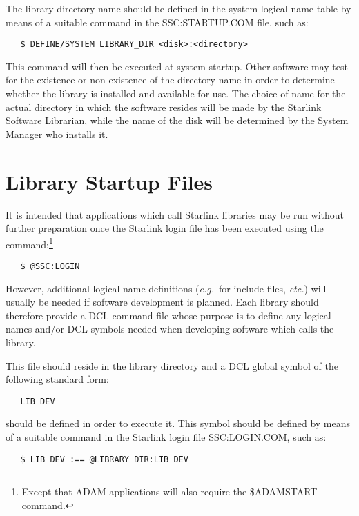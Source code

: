 The library directory name should be defined in the system logical name
table by means of a suitable command in the SSC:STARTUP.COM file, such as: 

\begin{verbatim}
   $ DEFINE/SYSTEM LIBRARY_DIR <disk>:<directory>
\end{verbatim}

This command will then be executed at system startup.
Other software may test for the existence or non-existence of the directory
name in order to determine whether the library is installed and available
for use. 
The choice of name for the actual directory in which the software resides
will be made by the Starlink Software Librarian, while the name of the disk
will be determined by the System Manager who installs it. 


\section{Library Startup Files}
\label{ss:librarystartup}

It is intended that applications which call Starlink libraries may be run
without further preparation once the Starlink login file has been executed
using the command:\footnote{Except that ADAM applications will also require
the \$ADAMSTART command.} 

\begin{verbatim}
   $ @SSC:LOGIN
\end{verbatim}

However, additional logical name definitions ({\em e.g.}\ for include files,
{\em etc.}) will usually be needed if software development is planned. 
Each library should therefore provide a DCL command file whose purpose is to
define any logical names and/or DCL symbols needed when developing software
which calls the library. 

This file should reside in the library directory and a DCL global symbol of
the following standard form: 

\begin{verbatim}
   LIB_DEV
\end{verbatim}

should be defined in order to execute it.
This symbol should be defined by means of a suitable command in the Starlink
login file SSC:LOGIN.COM, such as: 

\begin{verbatim}
   $ LIB_DEV :== @LIBRARY_DIR:LIB_DEV
\end{verbatim}

